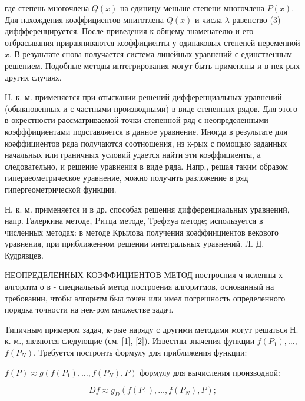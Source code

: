 \documentclass[10pt]{article}
\begin{document}
где степень многочлена $Q(x)$ на единицу меньше степени многочлена $P(x)$. Для нахождения коәффициентов мниготлена $Q(x)$ и числа $\lambda$ равенство (3) диффференцируется. После приведения к общему знаменателю и его отбрасывания приравниваются коэффициенты у одинаковых степеней переменной $x$. В результате снова получается система линейных уравнений с единственным решением. Подобные методы интегрирования могут быть применсны и в нек-рых других случаях.



Н. к. м. применяется при отыскании решений дифференциальных уравнений (обыкновенных и с частными производными) в виде степенных рядов. Для этого в окрестности рассматриваемой точки степенной ряд с неопределенными коэфффициентами подставляется в данное уравнение. Иногда в результате для коәффициентов ряда получаются соотношения, из к-рых с помощью заданных начальных или граничных условий удается найти эти коэффициенты, а следовательно, и решение уравнения в виде ряда. Напр., решая таким образом гипераеометрическое уравнение, можно получить разложение в ряд гипергеометрической функции.



Н. к. м. применяется и в др. способах решения дифференциальных уравнений, напр. Галеркина методе, Pитца методе, Трефøуа методе; используется в численных методах: в методе Крылова получения коәффиициентов векового уравнения, при приближенном решении интегральных уравнений. Л. Д. Кудрявцев.



НЕОПРЕДЕЛЕННЫХ КОЭФФИЦИЕНТОВ МЕТОД постросния ч исленны х алгоритм о в - специальный метод построения алгоритмов, основанный на требовании, чтобы алгоритм был точен или имел погрешность определенного порядка точности на нек-ром множестве задач.



Типичным примером задач, к-рые наряду с другими методами могут решаться Н. к. м., являются следующие (см. [1], [2]). Известны значения функции $f\left(P_{1}\right), \ldots$, $f\left(P_{N}\right)$. Требуется построить формулу для приближения функции:



$f(P) \approx g\left(f\left(P_{1}\right), \ldots, f\left(P_{N}\right), P\right)$ формулу для вычисления производной:



\[

D f \approx g_{D}\left(f\left(P_{1}\right), \ldots, f\left(P_{N}\right), P\right) ;

\]
\end{document}
